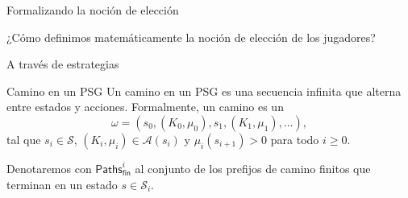 \documentclass{beamer}
\newcommand{\St}{\mathcal{S}}
\newcommand{\Act}{\mathcal{A}}
\newcommand{\Pathsfin}{\textsf{Paths}_{\textsf{fin}}}
\begin{document}
\begin{frame}{Formalizando la noci\'on de elecci\'on}
	\pause

	\begin{center}
		¿C\'omo definimos matem\'aticamente la noci\'on de elecci\'on de los jugadores?
		\pause

		A trav\'es de estrategias
	\end{center}
	\pause



	\begin{block}{Camino en un PSG}
		Un camino en un PSG es una secuencia infinita que alterna entre estados y acciones. Formalmente, un camino es un
		$$\omega = (s_0, (K_0, \mu_0), s_1, (K_1, \mu_1), \dots),$$
		tal que $s_i \in \St$, $(K_i, \mu_i) \in \Act(s_i)$ y $\mu_i(s_{i+1}) > 0$ para todo $i \geq 0$.

		\vspace{0.1cm}
		Denotaremos con $\Pathsfin^i$ al conjunto de los prefijos de camino
		finitos que terminan en un estado $s \in \St_i$.
	\end{block}

\end{frame}
\end{document}
